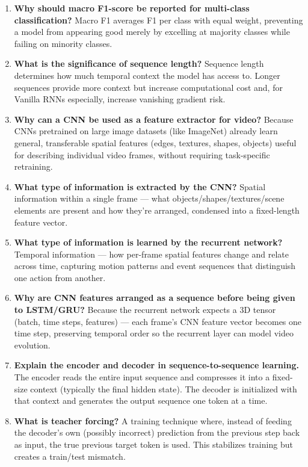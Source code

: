 \documentclass[10pt]{article}
\begin{document}
\begin{enumerate}
\item \textbf{Why should macro F1-score be reported for multi-class classification?}
Macro F1 averages F1 per class with equal weight, preventing a model from appearing good merely by excelling 
at majority classes while failing on minority classes.

\item \textbf{What is the significance of sequence length?}
Sequence length determines how much temporal context the model has access to. Longer sequences provide more 
context but increase computational cost and, for Vanilla RNNs especially, increase vanishing gradient risk.

\item \textbf{Why can a CNN be used as a feature extractor for video?}
Because CNNs pretrained on large image datasets (like ImageNet) already learn general, transferable spatial 
features (edges, textures, shapes, objects) useful for describing individual video frames, without requiring 
task-specific retraining.

\item \textbf{What type of information is extracted by the CNN?}
Spatial information within a single frame — what objects/shapes/textures/scene elements are present and how 
they're arranged, condensed into a fixed-length feature vector.

\item \textbf{What type of information is learned by the recurrent network?}
Temporal information — how per-frame spatial features change and relate across time, capturing motion patterns 
and event sequences that distinguish one action from another.

\item \textbf{Why are CNN features arranged as a sequence before being given to LSTM/GRU?}
Because the recurrent network expects a 3D tensor (batch, time steps, features) — each frame's CNN feature 
vector becomes one time step, preserving temporal order so the recurrent layer can model video evolution.

\item \textbf{Explain the encoder and decoder in sequence-to-sequence learning.}
The encoder reads the entire input sequence and compresses it into a fixed-size context (typically the 
final hidden state). The decoder is initialized with that context and generates the output sequence one 
token at a time.

\item \textbf{What is teacher forcing?}
A training technique where, instead of feeding the decoder's own (possibly incorrect) prediction from the 
previous step back as input, the true previous target token is used. This stabilizes training but creates 
a train/test mismatch.


\end{enumerate}
\end{document}
